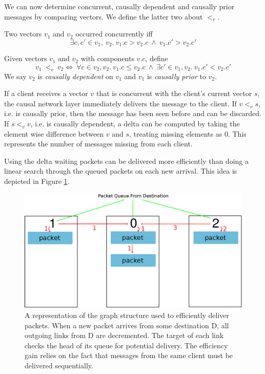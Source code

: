\documentclass[12pt,a4paper,twoside,openright]{report}
\begin{document}
		We can now determine concurrent, causally dependent and causally prior messages by comparing vectors. We define the latter two about $<_v$.
				
		Two vectors $v_1$ and $v_2$ occurred concurrently iff \[\exists c,c' \in v_1,\ v_2.\ v_1.c > v_2.c\ \land\ v_1.c' > v_2.c'\]
		
		Given vectors $v_1$ and $v_2$ with components $v.c$, define \[v_1\ <_v\ v_2 \iff\ \forall c \in v_2, v_2.\ v_1.c \leq v_2.c\ \land\ \exists c' \in v_1, v_2.\ v_1.c' < v_2.c'\]
		We say $v_2$ is \textit{causally dependent} on $v_1$ and $v_1$ is \textit{causally prior} to $v_2$.
		
		If a client receives a vector $v$ that is concurrent with the client's current vector $s$, the causal network layer immediately delivers the message to the client. If $v <_v s$, i.e. is causally prior, then the message has been seen before and can be discarded. If $s <_v v$, i.e. is causally dependent, a delta can be computed by taking the element wise difference between $v$ and $s$, treating missing elements as $0$. This represents the number of messages missing from each client. 
		
		Using the delta waiting packets can be delivered more efficiently than doing a linear search through the queued packets on each new arrival. This idea is depicted in Figure \ref{fig:efficient}.
 		\begin{figure}[htb]
 		\centering
 		\includegraphics[width=1\linewidth]{figs/efficient_message_buffer.eps}
 		\caption[Dependency Graph in Message Buffer]{A representation of the graph structure used to efficiently deliver packets. When a new packet arrives from some destination D, all outgoing links from D are decremented. The target of each link checks the head of its queue for potential delivery. The efficiency gain relies on the fact that messages from the same client must be delivered sequentially.}
 		\label{fig:efficient}
 		\end{figure}
		
\end{document}
